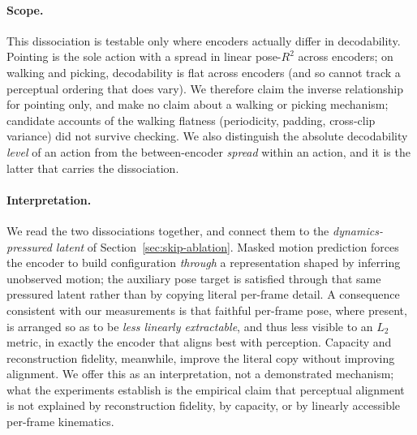\documentclass[letterpaper]{article} %
\begin{document}
\paragraph{Scope.} This dissociation is testable only where encoders actually differ in
decodability. Pointing is the sole action with a spread in linear pose-$R^2$ across encoders; on
walking and picking, decodability is flat across encoders (and so cannot track a perceptual ordering
that does vary). We therefore claim the inverse relationship for pointing only, and make no claim
about a walking or picking mechanism; candidate accounts of the walking flatness (periodicity,
padding, cross-clip variance) did not survive checking. We also distinguish the absolute
decodability \emph{level} of an action from the between-encoder \emph{spread} within an action, and it
is the latter that carries the dissociation.

\paragraph{Interpretation.} We read the two dissociations together, and connect them to the
\emph{dynamics-pressured latent} of Section~\ref{sec:skip-ablation}. Masked motion prediction forces
the encoder to build configuration \emph{through} a representation shaped by inferring unobserved
motion; the auxiliary pose target is satisfied through that same pressured latent rather than by
copying literal per-frame detail. A consequence consistent with our measurements is that faithful
per-frame pose, where present, is arranged so as to be \emph{less linearly extractable}, and thus
less visible to an $L_2$ metric, in exactly the encoder that aligns best with perception. Capacity
and reconstruction fidelity, meanwhile, improve the literal copy without improving alignment. We
offer this as an interpretation, not a demonstrated mechanism; what the experiments establish is the
empirical claim that perceptual alignment is not explained by reconstruction fidelity, by capacity,
or by linearly accessible per-frame kinematics.

\end{document}

